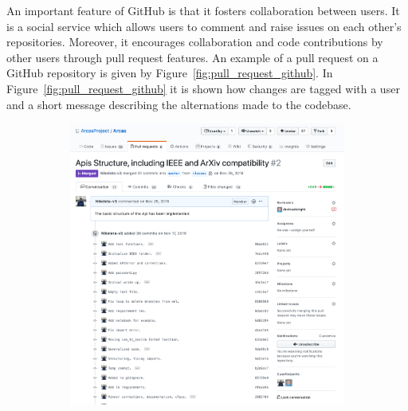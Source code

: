 An important feature of GitHub is that it fosters collaboration between users.
It is a social service which allows users to comment and raise issues on each
other's repositories. Moreover, it encourages collaboration and code contributions
by other users through pull request features. An example of a pull request on
a GitHub repository is given by Figure~\ref{fig:pull_request_github}. In Figure~\ref{fig:pull_request_github}
it is shown how changes are tagged with a user and a short message describing
the alternations made to the codebase.

\begin{figure}[!htbp]
\begin{subfigure}{0.5\textwidth}
    \centering
    \includegraphics[width=\textwidth]{src/chapters/01/img/GitHub_discussion}
\end{subfigure}
\begin{subfigure}{0.5\textwidth}
    \centering

\end{subfigure}
\end{figure}
